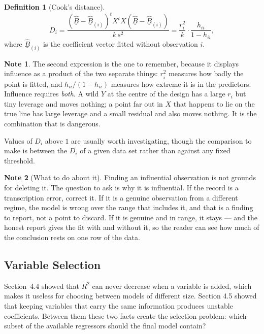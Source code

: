 \documentclass[11pt,a4paper]{article}
\theoremstyle{definition}
\newtheorem{defn}[thm]{Definition}
\newtheorem*{note}{Note}
\begin{document}
\begin{defn}[Cook's distance]
$$D_i=\frac{\left(\widehat{\underline{B}}-\widehat{\underline{B}}_{(i)}\right)^t
X^tX\left(\widehat{\underline{B}}-\widehat{\underline{B}}_{(i)}\right)}{k\,s^2}
=\frac{r_i^{2}}{k}\cdot\frac{h_{ii}}{1-h_{ii}},$$
where $\widehat{\underline{B}}_{(i)}$ is the coefficient vector fitted without
observation $i$.
\end{defn}

\begin{note}
The second expression is the one to remember, because it displays influence as
a product of the two separate things: $r_i^2$ measures how badly the point is
fitted, and $h_{ii}/(1-h_{ii})$ measures how extreme it is in the predictors.
Influence requires \emph{both}. A wild $Y$ at the centre of the design has a
large $r_i$ but tiny leverage and moves nothing; a point far out in $X$ that
happens to lie on the true line has large leverage and a small residual and
also moves nothing. It is the combination that is dangerous.

Values of $D_i$ above $1$ are usually worth investigating, though the
comparison to make is between the $D_i$ of a given data set rather than
against any fixed threshold.
\end{note}

\begin{note}[What to do about it]
Finding an influential observation is not grounds for deleting it. The
question to ask is why it is influential. If the record is a transcription
error, correct it. If it is a genuine observation from a different regime, the
model is wrong over the range that includes it, and that is a finding to
report, not a point to discard. If it is genuine and in range, it stays --- and
the honest report gives the fit with and without it, so the reader can see how
much of the conclusion rests on one row of the data.
\end{note}

\subsection{Variable Selection}

Section~4.4 showed that $R^2$ can never decrease when a variable is added,
which makes it useless for choosing between models of different size. Section
4.5 showed that keeping variables that carry the same information produces
unstable coefficients. Between them these two facts create the selection
problem: which subset of the available regressors should the final model
contain?
\end{document}
